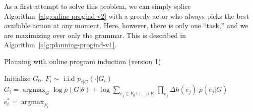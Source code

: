 \documentclass{article}
\DeclareMathOperator*{\argmax}{argmax}
\begin{document}
As a first attempt to solve this problem, we can simply splice
Algorithm~\ref{alg:online-progind-v2} with a greedy actor who always
picks the best available action at any moment. Here, however, there is
only one ``task,'' and we are maximizing over only the grammar. This
is described in Algorithm~\ref{alg:planning-progind-v1}.

\begin{algorithm}
\caption{Planning with online program induction (version
  1)}\label{alg:planning-progind-v1}
\begin{algorithmic}
\State Initialize $G_0$.
\State $F_i \sim \text{ i.i.d } p_{e|G}(\cdot | G_i)$
\State $G_i = \argmax_{G} \log p(G|\theta) 
+ \log \sum_{e_j \in F_0 \cup \dots \cup F_i}
\prod_{e_j} \Delta h(e_j) \; p(e_j|G) $
\State $e_i^* = \argmax_{F_i}$
\EndFor
\end{algorithmic}
\end{algorithm}






















 
\end{document}
